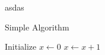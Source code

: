 \documentclass{article}
\begin{document}
asdas

\begin{algorithm}[htbp]
\caption{Simple Algorithm}
\begin{algorithmic}
    \State Initialize $x \gets 0$
        \State $x \gets x + 1$
    \EndWhile
\end{algorithmic}
\end{algorithm}
\end{document}
